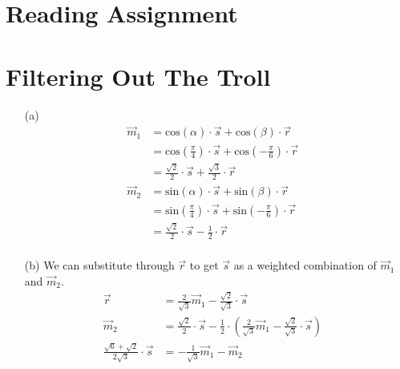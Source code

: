 \documentclass[10pt,a4paper]{article}
\begin{document}
\section{Reading Assignment}
\section{Filtering Out The Troll}
\begin{itemize}
  \item[(a)]
    \begin{align*}
      \vec{m}_{1} &= \text{cos}(\alpha) \cdot \vec{s} + \text{cos}(\beta) \cdot \vec{r}&\\
      &= \text{cos}(\frac{\pi}{4}) \cdot \vec{s} + \text{cos}(-\frac{\pi}{6}) \cdot \vec{r}&\\
      &= \frac{\sqrt{2}}{2} \cdot \vec{s} + \frac{\sqrt{3}}{2} \cdot \vec{r}&\\
      \vec{m}_{2} &= \text{sin}(\alpha) \cdot \vec{s} + \text{sin}(\beta) \cdot \vec{r}& \\
      &= \text{sin}(\frac{\pi}{4}) \cdot \vec{s} + \text{sin}(-\frac{\pi}{6}) \cdot \vec{r}&\\
      &= \frac{\sqrt{2}}{2} \cdot \vec{s} - \frac{1}{2} \cdot \vec{r}&\\
    \end{align*}
  \item[(b)] We can substitute through $\vec{r}$ to get $\vec{s}$ as a weighted combination of $\vec{m}_1$ and $\vec{m}_2$.
    \begin{align*}
      \vec{r} &= \frac{2}{\sqrt{3}}\vec{m}_{1} - \frac{\sqrt{2}}{\sqrt{3}} \cdot \vec{s}& \\
      \vec{m}_{2} &= \frac{\sqrt{2}}{2} \cdot \vec{s} - \frac{1}{2} \cdot (\frac{2}{\sqrt{3}}\vec{m}_{1} - \frac{\sqrt{2}}{\sqrt{3}} \cdot \vec{s})& \\
      \frac{\sqrt{6}+\sqrt{2}}{2\sqrt{3}} \cdot \vec{s} &= -\frac{1}{\sqrt{3}}\vec{m}_{1} - \vec{m}_{2}&
    \end{align*}
\end{itemize}
\end{document}

